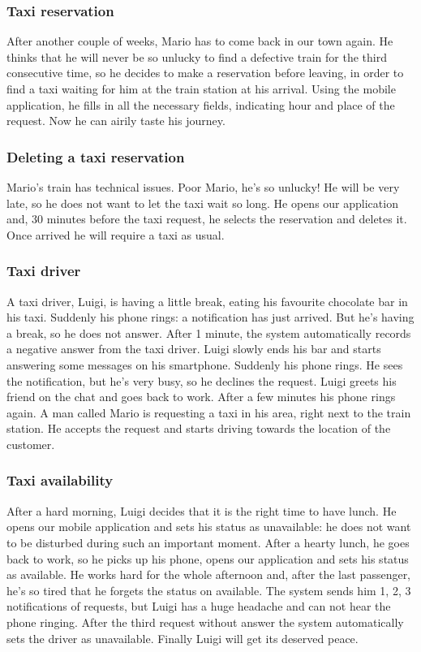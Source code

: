 		\subsubsection{Taxi reservation}
			After another couple of weeks, Mario has to come back in our town again. He thinks that he 
			will never be so unlucky to find a defective train for the third consecutive time,
			so he decides to make a reservation before leaving,	in order to find a taxi waiting for him
			at the train station at his arrival. Using the mobile application, he fills in all the
			necessary fields, indicating hour and place of the request.
			Now he can airily taste	his journey.
		\subsubsection{Deleting a taxi reservation}
			Mario's train has technical issues. Poor Mario, he's so unlucky! He will be very late, 
			so he does not want to let the taxi wait so long. He opens our application and, 30 minutes
			before the taxi request, he selects the reservation and deletes it. Once arrived he will
			require a taxi as usual.
		\subsubsection{Taxi driver}
			A taxi driver, Luigi, is having a little break, eating his favourite chocolate bar in his taxi. Suddenly
			his phone rings: a notification has just arrived. But he's having a break, so he does not answer.
			After 1 minute, the system automatically records a negative answer from the taxi driver.
			Luigi slowly ends his bar and starts answering some messages on his smartphone. Suddenly his phone
			rings. He sees the notification, but he's very busy, so he declines the request. Luigi greets his
			friend on the chat and goes back to work. After a few minutes his phone rings again. A man called
			Mario is requesting a taxi in his area, right next to the train station. He accepts the request and
			starts driving towards the location of the customer.
		\subsubsection{Taxi availability}
			After a hard morning, Luigi decides that it is the right time to have lunch. He opens our mobile
			application and sets his status as unavailable: he does not want to be disturbed during such an
			important moment. After a hearty lunch, he goes back to work, so he picks up his phone, opens our
			application and sets his status as available. He works hard for the whole afternoon and, after the
			last passenger, he's so tired that he forgets the status on available. The system sends him 1, 2, 3
			notifications of requests, but Luigi has a huge headache and can not hear the phone ringing. After
			the third request without answer the system automatically sets the driver as unavailable.
			Finally Luigi will get its deserved peace.